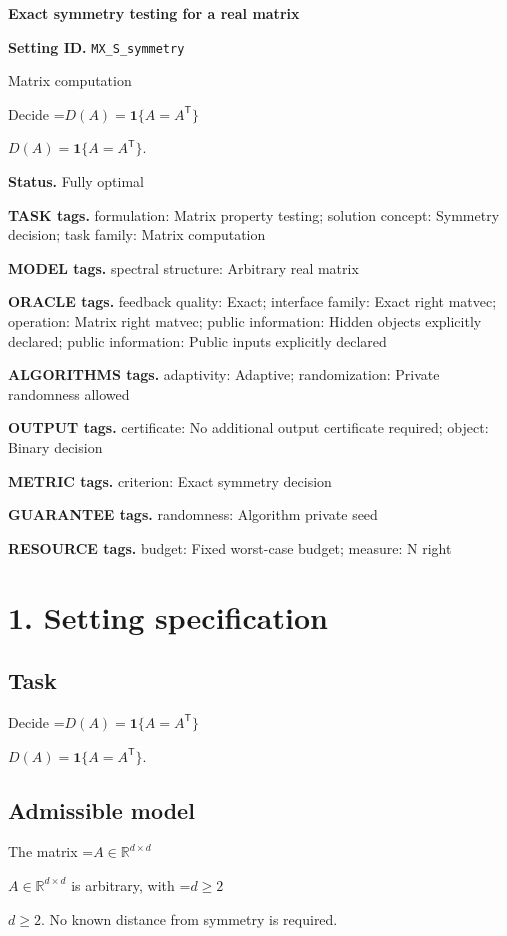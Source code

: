 \documentclass[10pt,a4paper]{article}
\newcommand{\AtlasMath}[1]{\par\begingroup\centering\setbox0=\hbox{$\displaystyle #1$}\ifdim\wd0>1.4\linewidth\typeout{ATLAS WIDE FORMULA: \the\wd0}\fi\ifdim\wd0>\linewidth\resizebox{\linewidth}{!}{\box0}\else\box0\fi\par\endgroup}
\newcommand{\AtlasInlineMath}[1]{\begingroup\setbox0=\hbox{$#1$}\ifdim\wd0>.4\linewidth\endgroup\AtlasMath{#1}\else\endgroup$#1$\fi}
\begin{document}
\raggedright

{\LARGE\bfseries\sffamily\color{AtlasNavy} Exact symmetry testing for a real matrix\par}\vspace{5pt}
\textbf{Setting ID.} \texttt{MX\_\allowbreak{}S\_\allowbreak{}symmetry}

Matrix computation

Decide \AtlasInlineMath{D(A)=\mathbf1\{A=A^{\mathsf T}\}}.

\textbf{Status.} Fully optimal

\textbf{TASK tags.} formulation: Matrix property testing; solution concept: Symmetry decision; task family: Matrix computation

\textbf{MODEL tags.} spectral structure: Arbitrary real matrix

\textbf{ORACLE tags.} feedback quality: Exact; interface family: Exact right matvec; operation: Matrix right matvec; public information: Hidden objects explicitly declared; public information: Public inputs explicitly declared

\textbf{ALGORITHMS tags.} adaptivity: Adaptive; randomization: Private randomness allowed

\textbf{OUTPUT tags.} certificate: No additional output certificate required; object: Binary decision

\textbf{METRIC tags.} criterion: Exact symmetry decision

\textbf{GUARANTEE tags.} randomness: Algorithm private seed

\textbf{RESOURCE tags.} budget: Fixed worst-case budget; measure: N right

\section{1. Setting specification}
\subsection{Task}
Decide \AtlasInlineMath{D(A)=\mathbf1\{A=A^{\mathsf T}\}}.

\subsection{Admissible model}
The matrix \AtlasInlineMath{A\in\mathbb R^{d\times d}} is arbitrary, with \AtlasInlineMath{d\ge2}. No known distance from symmetry is required.
\end{document}
